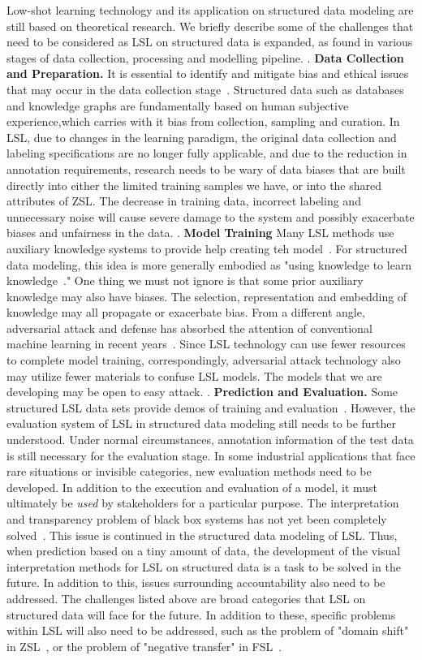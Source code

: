 \label{sec7.2}
Low-shot learning technology and its application on structured data modeling are still based on theoretical research. We briefly describe some of the challenges that need to be considered as LSL on structured data is expanded, as found in various stages of data collection, processing and modelling pipeline.
\uppercase\expandafter{}. \textbf{Data Collection and Preparation.} It is essential to identify and mitigate bias and ethical issues that may occur in the data collection stage~. Structured data such as databases and knowledge graphs are fundamentally based on human subjective experience,which carries with it bias from collection, sampling and curation. In LSL, due to changes in the learning paradigm, the original data collection and labeling specifications are no longer fully applicable, and due to the reduction in annotation requirements, research needs to be wary of data biases that are built directly into either the limited training samples we have, or into the shared attributes of ZSL. The decrease in training data, incorrect labeling and unnecessary noise will cause  severe damage to the system and possibly exacerbate biases and unfairness in the data.
\uppercase\expandafter{}. \textbf{Model Training} Many LSL methods use auxiliary knowledge systems to provide help creating teh model~. For structured data modeling, this idea is more generally embodied as "using knowledge to learn knowledge~." One thing we must not ignore is that some prior auxiliary knowledge may also have biases. The selection, representation and embedding of knowledge may all propagate or exacerbate bias.
From a different angle, adversarial attack and defense has absorbed the attention of conventional machine learning in recent years~. Since LSL technology can use fewer resources to complete model training, correspondingly, adversarial attack technology also may utilize fewer materials to confuse LSL models. The models that we are developing may be open to easy attack.
\uppercase\expandafter{}. \textbf{Prediction and Evaluation.} Some structured LSL data sets provide demos of training and evaluation~. However, the evaluation system of LSL in structured data modeling still needs to be further understood. Under normal circumstances, annotation information of the test data is still necessary for the evaluation stage. In some industrial applications that  face rare situations or invisible categories, new evaluation methods need to be developed.
In addition to the execution and evaluation of a model, it must ultimately be \textit{used} by stakeholders for a particular purpose. The interpretation and transparency problem of black box systems has not yet been completely solved~. This issue is continued in the structured data modeling of LSL. Thus, when prediction based on a tiny amount of data, the development of the visual interpretation methods for LSL on structured data is a task to be solved in the future. In addition to this, issues surrounding accountability also need to be addressed.
The challenges listed above are broad categories that  LSL on structured data will face for the future. In addition to these, specific problems within LSL will also need to be addressed, such as the problem of "domain shift" in ZSL~, or  the problem of "negative transfer" in FSL~.


